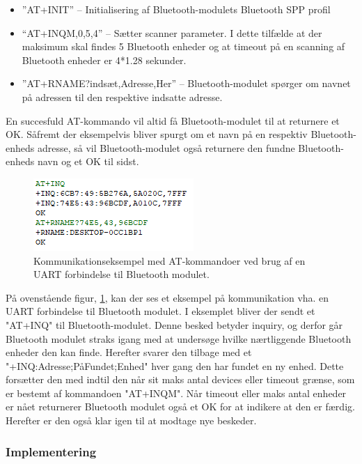 \begin{itemize}
	\item ”AT+INIT” – Initialisering af Bluetooth-modulets Bluetooth SPP profil
	\item “AT+INQM,0,5,4” – Sætter scanner parameter. I dette tilfælde at der maksimum skal findes 5 Bluetooth enheder og at timeout på en scanning af Bluetooth enheder er 4*1.28 sekunder.
	\item ”AT+RNAME?indsæt,Adresse,Her” – Bluetooth-modulet spørger om navnet på adressen til den respektive indsatte adresse.
\end{itemize}

En succesfuld AT-kommando vil altid få Bluetooth-modulet til at returnere et OK. Såfremt der eksempelvis bliver spurgt om et navn på en respektiv Bluetooth-enheds adresse, så vil Bluetooth-modulet også returnere den fundne Bluetooth-enheds navn og et OK til sidst. 

\begin{figure}[H]
	\centering
	\includegraphics[width = 200 pt]{Img/uart_eksempel.PNG}
	\caption{Kommunikationseksempel med AT-kommandoer ved brug af en UART forbindelse til Bluetooth modulet.}
	\label{fig:UART_eksempel}
\end{figure}

På ovenstående figur,  \ref{fig:UART_eksempel}, kan der ses et eksempel på kommunikation vha. en UART forbindelse til Bluetooth modulet. I eksemplet bliver der sendt et "AT+INQ"  til Bluetooth-modulet. Denne besked betyder inquiry, og derfor går Bluetooth modulet straks igang med at undersøge hvilke nærtliggende Bluetooth enheder den kan finde. Herefter svarer den tilbage med et "+INQ:Adresse;PåFundet;Enhed" hver gang den har fundet en ny enhed. Dette forsætter den med indtil den når sit maks antal devices eller timeout grænse, som er bestemt af kommandoen "AT+INQM". Når timeout eller maks antal enheder er nået returnerer Bluetooth modulet også et OK for at indikere at den er færdig. Herefter er den også klar igen til at modtage nye beskeder.

\subsubsection{Implementering}

